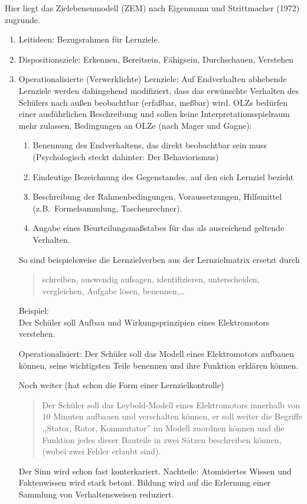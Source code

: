 Hier liegt das Zielebenenmodell (ZEM) nach Eigenmann und
Strittmacher (1972) zugrunde.

\begin{enumerate}
\item Leitideen: Bezugsrahmen f\"{u}r Lernziele.
\item Dispositionsziele:
Erkennen, Bereitsein, F\"{a}higsein, Durchschauen, Verstehen
\item
Operationalisierte (Verwerklichte) Lernziele:
Auf Endverhalten abhebende Lernziele werden dahingehend
modifiziert, dass das erw\"{u}nschte Verhalten des
Sch\"{u}lers nach au{\ss}en beobachtbar (erfa{\ss}bar, me{\ss}bar) wird.
OLZs bed\"{u}rfen einer ausf\"{u}hrlichen Beschreibung und sollen keine
Interpretationsspielraum mehr zulassen.
Bedingungen an OLZe (nach Mager und Gagne):
\begin{enumerate}
\item
Benennung des Endverhaltens, das direkt beobachtbar sein muss
(Psychologisch steckt dahinter: Der Behaviorismus)
\item
Eindeutige Bezeichnung des Gegenstandes, auf den sich
Lernziel bezieht
\item
Beschreibung der Rahmenbedingungen, Voraussetzungen,
Hilfsmittel (z.B.\ Formelsammlung, Taschenrechner).
\item
Angabe eines Beurteilungsma{\ss}stabes  f\"{u}r das als ausreichend
geltende Verhalten.
\end{enumerate}  %

So sind beispielsweise die Lernzielverben aus der
Lernzielmatrix ersetzt durch
\begin{quote}
schreiben, auswendig aufsagen, identifizieren, unterscheiden,
vergleichen, Aufgabe l\"{o}sen, benennen,\dots
\end{quote}

\mip
Beispiel: \\
Der Sch\"{u}ler soll Aufbau und Wirkungsprinzipien eines
Elektromotors verstehen.

\mip
Operationalisiert:
Der Sch\"{u}ler soll das Modell eines Elektromotors aufbauen k\"{o}nnen,
seine wichtigsten Teile benennen und ihre Funktion erkl\"{a}ren k\"{o}nnen.

\mip
Noch weiter (hat schon die Form einer Lernzielkontrolle)
\begin{quote}
Der Sch\"{u}ler soll das Leybold-Modell eines Elektromotors
innerhalb von 10 Minuten aufbauen und verschalten k\"{o}nnen, er
soll weiter die Begriffe ,,Stator, Rotor, Kommutator'' im
Modell zuordnen k\"{o}nnen und die Funktion jedes dieser Bauteile
in zwei S\"{a}tzen beschreiben k\"{o}nnen, (wobei zwei Fehler erlaubt
sind).
\end{quote}

Der Sinn wird schon fast konterkariert.
Nachteile: Atomisiertes Wissen und Faktenwissen wird stark betont.
Bildung wird auf die Erlernung einer Sammlung von
Verhaltensweisen reduziert.
\end{enumerate}

